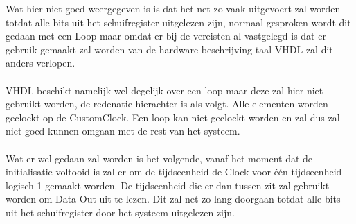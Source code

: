 Wat hier niet goed weergegeven is is dat het net zo vaak uitgevoert zal worden totdat alle bits uit het schuifregister uitgelezen zijn, normaal gesproken wordt dit gedaan met een Loop maar omdat er bij de vereisten al vastgelegd is dat er gebruik gemaakt zal worden van de hardware beschrijving taal VHDL zal dit anders verlopen.\\\\
VHDL beschikt namelijk wel degelijk over een loop maar deze zal hier niet gebruikt worden, de redenatie hierachter is als volgt. Alle elementen worden geclockt op de CustomClock. Een loop kan niet geclockt worden en zal dus zal niet goed kunnen omgaan met de rest van het systeem.
\\\\
Wat er wel gedaan zal worden is het volgende, vanaf het moment dat de initialisatie voltooid is zal er om de tijdseenheid de Clock voor één tijdseenheid logisch 1 gemaakt worden. De tijdseenheid die er dan tussen zit zal gebruikt worden om Data-Out uit te lezen.
Dit zal net zo lang doorgaan totdat alle bits uit het schuifregister door het systeem uitgelezen zijn.